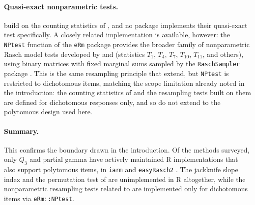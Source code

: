 \documentclass{article}
\begin{document}
\paragraph{Quasi-exact nonparametric tests.}
\citet{debelakkoller2020} build on the counting statistics of \citet{ponocny2001}, and no package
implements their quasi-exact test specifically. A closely related implementation is available,
however: the \texttt{NPtest} function of the \texttt{eRm} package \citep{mairhatzinger2007}
provides the broader family of nonparametric Rasch model tests developed by \citet{ponocny2001}
and \citet{kollerhatzinger2013} (statistics $T_1$, $T_4$, $T_7$, $T_{10}$, $T_{11}$, and others),
using binary matrices with fixed marginal sums sampled by the \texttt{RaschSampler} package
\citep{verhelst2007}. This is the same resampling principle that \citet{debelakkoller2020} extend,
but \texttt{NPtest} is restricted to dichotomous items, matching the scope limitation already
noted in the introduction: the counting statistics of \citet{ponocny2001} and the resampling
tests built on them are defined for dichotomous responses only, and so do not extend to the
polytomous design used here.

\paragraph{Summary.}
This confirms the boundary drawn in the introduction. Of the methods surveyed, only $Q_3$
\citep{yen1984} and partial gamma \citep{davis1967} have actively maintained R implementations
that also support polytomous items, in \texttt{iarm} \citep{muellersantiago2022} and
\texttt{easyRasch2} \citep{johansson2026b}. The jackknife slope index and the permutation test of
\citet{finchjeffers2016} are unimplemented in R altogether, while the nonparametric resampling
tests related to \citet{debelakkoller2020} are implemented only for dichotomous items via
\texttt{eRm::NPtest}.



\end{document}
